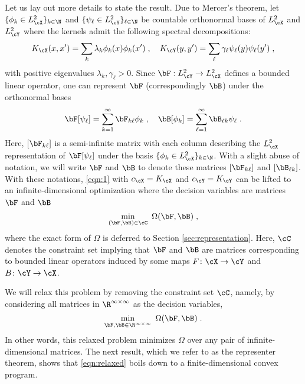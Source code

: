 \documentclass[11pt]{article}
\begin{document}
Let us lay out more details to state the result. Due to Mercer's theorem,  let $\{ \phi_k \in L^2_{\cX} \}_{k \in \N} $ and $\{ \psi_\ell \in L^2_{\cY} \}_{\ell \in \N}$ be countable orthonormal bases of $L^2_{\cX}$ and $L^2_{\cY}$ where the kernels admit the following spectral decompositions:
\begin{align}
	\label{eqn:spectral}
	K_{\cX}(x, x') = \sum_k \lambda_k \phi_k(x) \phi_k(x') \;, \quad   K_{\cY}(y, y') = \sum_{\ell} \gamma_\ell \psi_\ell(y) \psi_\ell(y') \;,
\end{align}
with positive eigenvalues $\lambda_k, \gamma_\ell >0$.
Since $\bF: L^2_{\cY} \rightarrow L^2_{\cX}$ defines a bounded linear operator, one can represent $\bF$ (correspondingly $\bB$) under the orthonormal bases
\begin{align}
	\bF[\psi_{\ell}] = \sum_{k = 1}^{\infty} \bF_{k \ell} \phi_k\;, \quad \bB[\phi_{k}] = \sum_{\ell = 1}^{\infty} \bB_{\ell k} \psi_\ell\;.
\end{align}
Here, $[\bF_{k \ell}]$ is a semi-infinite matrix with each column describing the $L^2_{\cX}$ representation of $\bF[\psi_{\ell}]$ under the basis $\{ \phi_k \in L^2_{\cX} \}_{k \in \N}$. With a slight abuse of notation, we will write $\bF$ and $\bB$ to denote these matrices $[\bF_{k \ell}]$ and $[\bB_{\ell k}]$. With these notations, \eqref{eqn:1} with $c_{\cX} = K_{\cX}$ and $c_{\cY} = K_{\cY}$ can be lifted to an infinite-dimensional optimization where the decision variables are matrices $\bF$ and $\bB$
\begin{equation}
	\label{eqn:op}
	\min_{(\bF, \bB) \in \cC} ~ \Omega(\bF, \bB)\;,
\end{equation}
where the exact form of $\Omega$ is deferred to Section \ref{sec:representation}. Here, $\cC$ denotes the constraint set implying that $\bF$ and $\bB$ are matrices corresponding to bounded linear operators induced by some maps $F \colon \cX \to \cY$ and $B \colon \cY \to \cX$.

We will relax this problem by removing the constraint set $\cC$, namely, by considering all matrices in $\R^{\infty \times \infty}$ as the decision variables, 
\begin{equation}
	\label{eqn:relaxed}
	\min_{\bF, \bB \in \R^{\infty \times \infty}} ~ \Omega(\bF, \bB)\;.
\end{equation}
In other words, this relaxed problem minimizes $\Omega$ over any pair of infinite-dimensional matrices. The next result, which we refer to as the representer theorem, shows that \eqref{eqn:relaxed} boils down to a finite-dimensional convex program. 
\end{document}
